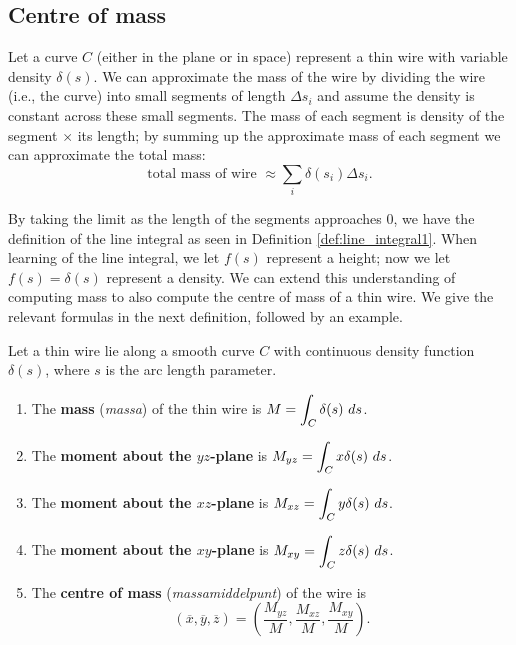\subsection{Centre of mass}
Let a curve $C$ (either in the plane or in space) represent a thin wire with variable density $\delta(s)$. We can approximate the mass of the wire by dividing the wire (i.e., the curve) into small segments of length $\Delta s_i$ and assume the density is constant across these small segments. The mass of each segment is density of the segment $\times$ its length; by summing up the approximate mass of each segment we can approximate the total mass:
$$\text{total mass of wire } \approx \sum\limits_i \delta(s_i)\Delta s_i.$$

By taking the limit as the length of the segments approaches 0, we have the definition of the line integral as seen in Definition \ref{def:line_integral1}. When learning of the line integral, we let $f(s)$ represent a height; now we let $f(s) = \delta(s)$ represent a density. We can extend this understanding of computing mass to also compute the centre of mass of a thin wire. We give the relevant formulas in the next definition, followed by an example.

\begin{definition}\label{def:mass_of_thin_wire}
Let a thin wire lie along a smooth curve $C$ with continuous density function $\delta(s)$, where $s$ is the arc length parameter. 	%
\begin{enumerate}
	\item The \textbf{mass} (\textit{massa}) of the thin wire is $\ds M = \int_C \delta(s)\ ds$.
	\item The \textbf{moment about the $yz$-plane} is $\ds M_{yz} = \int_C x\delta(s)\ ds$.
	\item The \textbf{moment about the $xz$-plane} is $\ds M_{xz} = \int_C y\delta(s)\ ds$.
	\item The \textbf{moment about the $xy$-plane} is $\ds M_{xy} = \int_C z\delta(s)\ ds$.
	\item The \textbf{centre of mass} (\textit{massamiddelpunt}) of the wire is $$(\overline{x},\overline{y},\overline{z}) = \left(\frac{M_{yz}}M, \frac{M_{xz}}M,\frac{M_{xy}}M\right).$$
\end{enumerate}
\end{definition}


